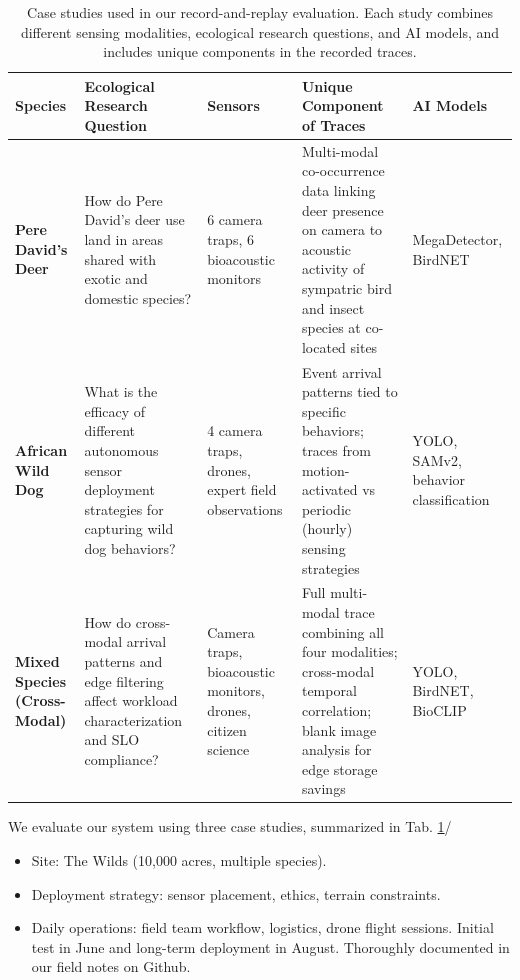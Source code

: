 \documentclass[letterpaper,twocolumn,10pt]{article}
\begin{document}
\begin{table}[t]
\centering
\label{table:case_studies}
\begin{tabular}{p{2.5cm} p{3.5cm} p{3.8cm} p{3.8cm} p{3cm}}
\toprule
\textbf{Species} & \textbf{Ecological Research Question} & \textbf{Sensors} & \textbf{Unique Component of Traces} & \textbf{AI Models} \\
\midrule
\textbf{Pere David's Deer} & How do Pere David's deer use land in areas shared with exotic and domestic species? & 6 camera traps, 6 bioacoustic monitors & Multi-modal co-occurrence data linking deer presence on camera to acoustic activity of sympatric bird and insect species at co-located sites & MegaDetector, BirdNET \\
\textbf{African Wild Dog} & What is the efficacy of different autonomous sensor deployment strategies for capturing wild dog behaviors? & 4 camera traps, drones, expert field observations & Event arrival patterns tied to specific behaviors; traces from motion-activated vs periodic (hourly) sensing strategies & YOLO, SAMv2, behavior classification \\
\textbf{Mixed Species (Cross-Modal)} & How do cross-modal arrival patterns and edge filtering affect workload characterization and SLO compliance? & Camera traps, bioacoustic monitors, drones, citizen science & Full multi-modal trace combining all four modalities; cross-modal temporal correlation; blank image analysis for edge storage savings & YOLO, BirdNET, BioCLIP \\
\bottomrule
\end{tabular}
\caption{Case studies used in our record-and-replay evaluation. Each study combines different sensing modalities, ecological research questions, and AI models, and includes unique components in the recorded traces.}
\end{table}

We evaluate our system using three case studies, summarized in Tab. \ref{table:case_studies}/
\begin{itemize}
  \item Site: The Wilds (10,000 acres, multiple species).
  \item Deployment strategy: sensor placement, ethics, terrain constraints.
  \item Daily operations: field team workflow, logistics, drone flight sessions. Initial test in June and long-term deployment in August. Thoroughly documented in our field notes on Github.
\end{itemize}
\end{document}
